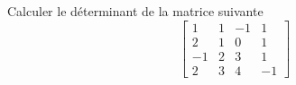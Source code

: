 Calculer le d\'eterminant de la matrice suivante
\[
\left[ 
\begin{array}{cccc}
1&1&-1&1\\
2&1&0&1 \\
-1&2&3&1 \\
2&3&4&-1
\end{array}
\right]
\]